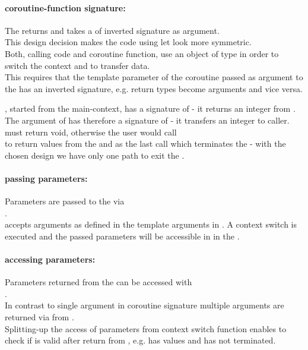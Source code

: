 \paragraph*{coroutine-function signature:}
The \corofunction returns  and takes a \coro of inverted signature
as argument.\\
\newline
This design decision makes the code using \coro let look more symmetric.\\
Both, calling code and coroutine function, use an object of type \coro in order
to switch the context and to transfer data.\\
This requires that the template parameter of the coroutine passed as argument
to the \corofunction has an inverted signature, e.g. return types become
arguments and vice versa.

\coro, started from the main-context, has a signature of  - it returns an
integer from \corofunction.\\
The \coro argument of \corofunction {} has therefore a signature of
 - it transfers an integer to caller.\\
\newline
\corofunction must return void, otherwise the user would call\\
\coroop to return values from the \corofunction and  as the
last call which terminates the \corofunction - with the chosen design we have
only one path to exit the \corofunction.

\paragraph*{passing parameters:}
Parameters are passed to the \corofunction via\\\coroop.\\
\newline
\coroop accepts arguments as defined in the template arguments in \coro. A
context switch is executed and the passed parameters will be accessible in in
the \corofunction.

\paragraph*{accessing parameters:}
Parameters returned from the \corofunction can be accessed with\\\coroget.\\
\newline
In contrast to single argument in coroutine signature multiple arguments are
returned via \tuple from \coroget.\\
Splitting-up the access of parameters from context switch function enables to
check if \coro is valid after return from \coroop, e.g. \coro has values and
\corofunction has not terminated.

